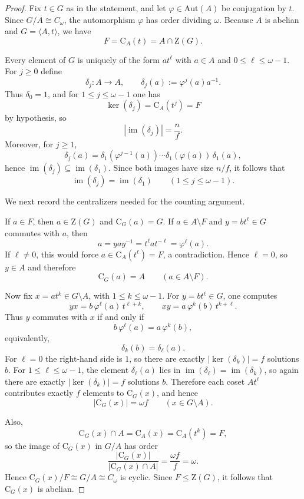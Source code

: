 \documentclass[11pt]{article}
\theoremstyle{definition}
\theoremstyle{remark}
\theoremstyle{definition}
\theoremstyle{plain}
\newcommand{\Z}{\mathrm{Z}}
\newcommand{\C}{\mathrm{C}}
\newcommand{\Aut}{\mathrm{Aut}}
\begin{document}
\begin{proof}
Fix $t\in G$ as in the statement, and let $\varphi\in \Aut(A)$ be conjugation by $t$.
Since $G/A\cong C_{\omega}$, the automorphism $\varphi$ has order dividing $\omega$.
Because $A$ is abelian and $G=\langle A,t\rangle$, we have
\[
F=\C_A(t)=A\cap \Z(G).
\]

Every element of $G$ is uniquely of the form $a t^\ell$ with $a\in A$ and $0\le \ell\le \omega-1$.
For $j\ge 0$ define
\[
\delta_j:A\to A,\qquad \delta_j(a):=\varphi^j(a)a^{-1}.
\]
Thus $\delta_0=1$, and for $1\le j\le \omega-1$ one has
\[
\ker(\delta_j)=\C_A(t^j)=F
\]
by hypothesis, so
\[
|\operatorname{im}(\delta_j)|=\frac{n}{f}.
\]
Moreover, for $j\ge 1$,
\[
\delta_j(a)=\delta_1(\varphi^{j-1}(a))\cdots \delta_1(\varphi(a))\,\delta_1(a),
\]
hence $\operatorname{im}(\delta_j)\subseteq \operatorname{im}(\delta_1)$.
Since both images have size $n/f$, it follows that
\[
\operatorname{im}(\delta_j)=\operatorname{im}(\delta_1)\qquad (1\le j\le \omega-1).
\]

We next record the centralizers needed for the counting argument.

If $a\in F$, then $a\in \Z(G)$ and $\C_G(a)=G$.
If $a\in A\setminus F$ and $y=b t^\ell\in G$ commutes with $a$, then
\[
a=yay^{-1}=t^\ell a t^{-\ell}=\varphi^\ell(a).
\]
If $\ell\ne 0$, this would force $a\in \C_A(t^\ell)=F$, a contradiction.
Hence $\ell=0$, so $y\in A$ and therefore
\[
\C_G(a)=A \qquad (a\in A\setminus F).
\]

Now fix $x=a t^k\in G\setminus A$, with $1\le k\le \omega-1$.
For $y=b t^\ell\in G$, one computes
\[
yx=b\,\varphi^\ell(a)\,t^{\ell+k},
\qquad
xy=a\,\varphi^k(b)\,t^{k+\ell}.
\]
Thus $y$ commutes with $x$ if and only if
\[
b\,\varphi^\ell(a)=a\,\varphi^k(b),
\]
equivalently,
\[
\delta_k(b)=\delta_\ell(a).
\]
For $\ell=0$ the right-hand side is $1$, so there are exactly $|\ker(\delta_k)|=f$ solutions $b$.
For $1\le \ell\le \omega-1$, the element $\delta_\ell(a)$ lies in $\operatorname{im}(\delta_\ell)=\operatorname{im}(\delta_k)$, so again there are exactly $|\ker(\delta_k)|=f$ solutions $b$.
Therefore each coset $At^\ell$ contributes exactly $f$ elements to $\C_G(x)$, and hence
\[
|\C_G(x)|=\omega f \qquad (x\in G\setminus A).
\]

Also,
\[
\C_G(x)\cap A=\C_A(x)=\C_A(t^k)=F,
\]
so the image of $\C_G(x)$ in $G/A$ has order
\[
\frac{|\C_G(x)|}{|\C_G(x)\cap A|}=\frac{\omega f}{f}=\omega.
\]
Hence $\C_G(x)/F\cong G/A\cong C_\omega$ is cyclic. Since $F\le \Z(G)$, it follows that $\C_G(x)$ is abelian.


\end{proof}
\end{document}

